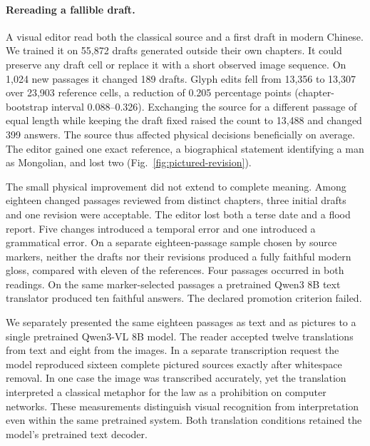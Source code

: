 \paragraph{Rereading a fallible draft.}
A visual editor read both the classical source and a first draft in modern Chinese. We trained it on 55,872 drafts generated outside their own chapters. It could preserve any draft cell or replace it with a short observed image sequence. On 1,024 new passages it changed 189 drafts. Glyph edits fell from 13,356 to 13,307 over 23,903 reference cells, a reduction of 0.205 percentage points (chapter-bootstrap interval 0.088--0.326). Exchanging the source for a different passage of equal length while keeping the draft fixed raised the count to 13,488 and changed 399 answers. The source thus affected physical decisions beneficially on average. The editor gained one exact reference, a biographical statement identifying a man as Mongolian, and lost two (Fig.~\ref{fig:pictured-revision}).

The small physical improvement did not extend to complete meaning. Among eighteen changed passages reviewed from distinct chapters, three initial drafts and one revision were acceptable. The editor lost both a terse date and a flood report. Five changes introduced a temporal error and one introduced a grammatical error. On a separate eighteen-passage sample chosen by source markers, neither the drafts nor their revisions produced a fully faithful modern gloss, compared with eleven of the references. Four passages occurred in both readings. On the same marker-selected passages a pretrained Qwen3 8B text translator produced ten faithful answers. The declared promotion criterion failed.

We separately presented the same eighteen passages as text and as pictures to a single pretrained Qwen3-VL 8B model. The reader accepted twelve translations from text and eight from the images. In a separate transcription request the model reproduced sixteen complete pictured sources exactly after whitespace removal. In one case the image was transcribed accurately, yet the translation interpreted a classical metaphor for the law as a prohibition on computer networks. These measurements distinguish visual recognition from interpretation even within the same pretrained system. Both translation conditions retained the model's pretrained text decoder.
